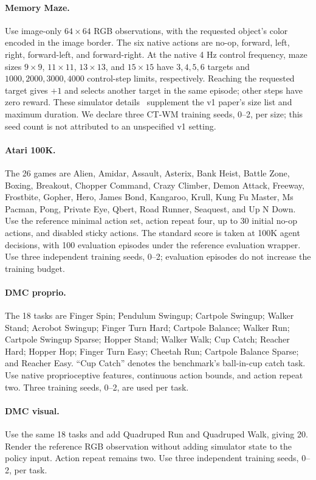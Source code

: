 \documentclass{article}
\begin{document}
\paragraph{Memory Maze.}
Use image-only $64\times64$ RGB observations, with the requested object's color encoded in the image border. The six native actions are no-op, forward, left, right, forward-left, and forward-right. At the native 4 Hz control frequency, maze sizes $9\times9$, $11\times11$, $13\times13$, and $15\times15$ have $3,4,5,6$ targets and $1000,2000,3000,4000$ control-step limits, respectively. Reaching the requested target gives $+1$ and selects another target in the same episode; other steps have zero reward. These simulator details~\cite{memorymaze2022code} supplement the v1 paper's size list and maximum duration. We declare three CT-WM training seeds, 0--2, per size; this seed count is not attributed to an unspecified v1 setting.

\paragraph{Atari 100K.}
The 26 games are Alien, Amidar, Assault, Asterix, Bank Heist, Battle Zone, Boxing, Breakout, Chopper Command, Crazy Climber, Demon Attack, Freeway, Frostbite, Gopher, Hero, James Bond, Kangaroo, Krull, Kung Fu Master, Ms Pacman, Pong, Private Eye, Qbert, Road Runner, Seaquest, and Up N Down. Use the reference minimal action set, action repeat four, up to 30 initial no-op actions, and disabled sticky actions. The standard score is taken at 100K agent decisions, with 100 evaluation episodes under the reference evaluation wrapper. Use three independent training seeds, 0--2; evaluation episodes do not increase the training budget.

\paragraph{DMC proprio.}
The 18 tasks are Finger Spin; Pendulum Swingup; Cartpole Swingup; Walker Stand; Acrobot Swingup; Finger Turn Hard; Cartpole Balance; Walker Run; Cartpole Swingup Sparse; Hopper Stand; Walker Walk; Cup Catch; Reacher Hard; Hopper Hop; Finger Turn Easy; Cheetah Run; Cartpole Balance Sparse; and Reacher Easy. ``Cup Catch'' denotes the benchmark's ball-in-cup catch task. Use native proprioceptive features, continuous action bounds, and action repeat two. Three training seeds, 0--2, are used per task.

\paragraph{DMC visual.}
Use the same 18 tasks and add Quadruped Run and Quadruped Walk, giving 20. Render the reference RGB observation without adding simulator state to the policy input. Action repeat remains two. Use three independent training seeds, 0--2, per task.
\end{document}
